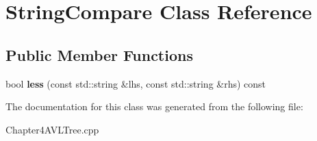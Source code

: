 \hypertarget{class_string_compare}{}\section{String\+Compare Class Reference}
\label{class_string_compare}
\subsection*{Public Member Functions}
\begin{DoxyCompactItemize}
\item 
\hypertarget{class_string_compare_a8eebd6a13ed1c47d8c003c5c8da635f5}{}\label{class_string_compare_a8eebd6a13ed1c47d8c003c5c8da635f5} 
bool {\bfseries less} (const std\+::string \&lhs, const std\+::string \&rhs) const
\end{DoxyCompactItemize}


The documentation for this class was generated from the following file\+:\begin{DoxyCompactItemize}
\item 
Chapter4\+A\+V\+L\+Tree.\+cpp\end{DoxyCompactItemize}

